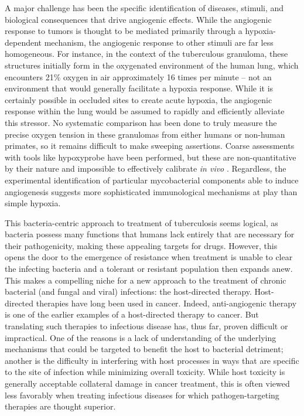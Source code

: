 A major challenge has been the specific identification of diseases, stimuli, and biological consequences that drive angiogenic effects. While the angiogenic response to tumors is thought to be mediated primarily through a hypoxia\hyp{}dependent mechanism, the angiogenic response to other stimuli are far less homogeneous. For instance, in the context of the tuberculous granuloma, these structures initially form in the oxygenated environment of the human lung, which encounters 21\% oxygen in air approximately 16 times per minute -- not an environment that would generally facilitate a hypoxia response. While it is certainly possible in occluded sites to create acute hypoxia, the angiogenic response within the lung would be assumed to rapidly and efficiently alleviate this stressor. No systematic comparison has been done to truly measure the precise oxygen tension in these granulomas from either humans or non\hyp{}human primates, so it remains difficult to make sweeping assertions. Coarse assessments with tools like hypoxyprobe have been performed, but these are non\hyp{}quantitative by their nature and impossible to effectively calibrate \textit{in vivo} \citep{Cousins2016}. Regardless, the experimental identification of particular mycobacterial components able to induce angiogenesis suggests more sophisticated immunological mechanisms at play than simple hypoxia.

This bacteria\hyp{}centric approach to treatment of tuberculosis seems logical, as bacteria possess many functions that humans lack entirely that are necessary for their pathogenicity, making these appealing targets for drugs. However, this opens the door to the emergence of resistance when treatment is unable to clear the infecting bacteria and a tolerant or resistant population then expands anew. This makes a compelling niche for a new approach to the treatment of chronic bacterial (and fungal and viral) infections: the host\hyp{}directed therapy. Host\hyp{}directed therapies have long been used in cancer. Indeed, anti\hyp{}angiogenic therapy is one of the earlier examples of a host\hyp{}directed therapy to cancer. But translating such therapies to infectious disease has, thus far, proven difficult or impractical. One of the reasons is a lack of understanding of the underlying mechanisms that could be targeted to benefit the host to bacterial detriment; another is the difficulty in interfering with host processes in ways that are specific to the site of infection while minimizing overall toxicity. While host toxicity is generally acceptable collateral damage in cancer treatment, this is often viewed less favorably when treating infectious diseases for which pathogen\hyp{}targeting therapies are thought superior. 

